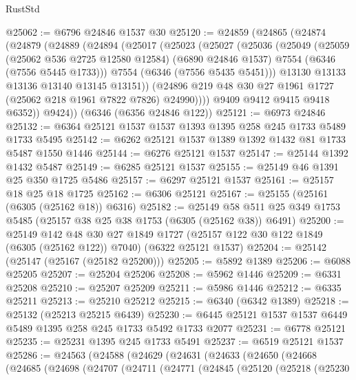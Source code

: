 \begin{lexlean}{RustStd}
\begin{coremodule}
@25062 := @6796 @24846 @1537 @30
@25120 := @24859
    (@24865
      (@24874
        (@24879
          (@24889
            (@24894
              (@25017
                (@25023
                  (@25027
                    (@25036
                      (@25049
                        (@25059
                          (@25062 @536 @2725 @12580 @12584)
                          (@6890 @24846 @1537)
                          @7554
                          (@6346 (@7556 @5445 @1733)))
                        @7554
                        (@6346 (@7556 @5435 @5451)))
                      @13130
                      @13133
                      @13136
                      @13140
                      @13145
                      @13151))
                  (@24896 @219 @48 @30 @27 @1961 @1727 (@25062 @218 @1961 @7822 @7826) @24990))))
            @9409
            @9412
            @9415
            @9418
            @6352))
        @9424))
    (@6346 (@6356 @24846 @122))
@25121 := @6973 @24846
@25132 := @6364 @25121 @1537 @1537 @1393 @1395 @258 @245 @1733 @5489 @1733 @5495
@25142 := @6262 @25121 @1537 @1389 @1392 @1432 @81 @1733 @5487 @1550 @1446
@25144 := @6276 @25121 @1537
@25147 := @25144 @1392 @1432 @5487
@25149 := @6285 @25121 @1537
@25155 := @25149 @46 @1391 @25 @350 @1725 @5486
@25157 := @6297 @25121 @1537
@25161 := @25157 @18 @25 @18 @1725
@25162 := @6306 @25121
@25167 := @25155 (@25161 (@6305 (@25162 @18)) @6316)
@25182 := @25149 @58 @511 @25 @349 @1753 @5485 (@25157 @38 @25 @38 @1753 (@6305 (@25162 @38)) @6491)
@25200 := @25149
    @142
    @48
    @30
    @27
    @1849
    @1727
    (@25157 @122 @30 @122 @1849 (@6305 (@25162 @122)) @7040)
    (@6322 @25121 @1537)
@25204 := @25142 (@25147 (@25167 (@25182 @25200)))
@25205 := @5892 @1389
@25206 := @6088 @25205
@25207 := @25204 @25206
@25208 := @5962 @1446
@25209 := @6331 @25208
@25210 := @25207 @25209
@25211 := @5986 @1446
@25212 := @6335 @25211
@25213 := @25210 @25212
@25215 := @6340 (@6342 @1389)
@25218 := @25132 (@25213 @25215 @6439)
@25230 := @6445 @25121 @1537 @1537 @6449 @5489 @1395 @258 @245 @1733 @5492 @1733 @2077
@25231 := @6778 @25121
@25235 := @25231 @1395 @245 @1733 @5491
@25237 := @6519 @25121 @1537
@25286 := @24563
    (@24588
      (@24629
        (@24631
          (@24633
            (@24650
              (@24668
                (@24685
                  (@24698
                    (@24707
                      (@24711
                        (@24771
                          (@24845
                            (@25120
                              (@25218
                                (@25230

\end{coremodule}
\end{lexlean}
